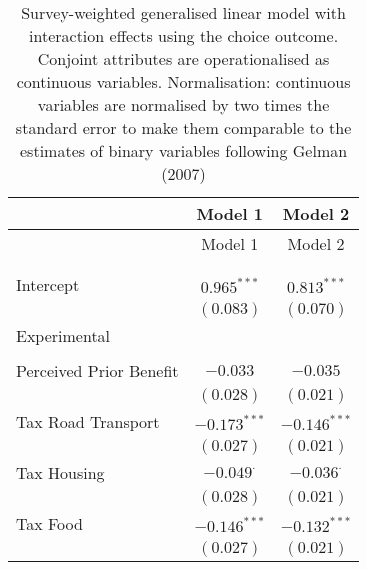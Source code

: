
\begin{center}
\begin{tiny}
\begin{longtable}{l@{} c@{} c@{}}
\hline
 & Model 1 & Model 2 \\
\hline
\endfirsthead
\hline
 & Model 1 & Model 2 \\
\hline
\endhead
\hline
\endfoot
\hline
\multicolumn{3}{l}{\tiny{$^{***}p<0.001$; $^{**}p<0.01$; $^{*}p<0.05$; $^{\cdot}p<0.1$}}\\
\caption{Survey-weighted generalised linear model with interaction effects using the choice outcome. Conjoint attributes are operationalised as continuous variables. Normalisation: continuous variables are normalised by two times 
               the standard error to make them comparable to the estimates of binary variables following Gelman (2007)}
\label{table:weighted_interactions_exp_continous_choice}
\endlastfoot \\
Intercept                                                & $0.965^{***}$    & $0.813^{***}$    \\
                                                         & $(0.083)$        & $(0.070)$        \\
Experimental                                             &                  &                  \\
                                                         &                  &                  \\
\quad Perceived Prior Benefit                            & $-0.033$         & $-0.035$         \\
                                                         & $(0.028)$        & $(0.021)$        \\
\quad Tax Road Transport                                 & $-0.173^{***}$   & $-0.146^{***}$   \\
                                                         & $(0.027)$        & $(0.021)$        \\
\quad Tax Housing                                        & $-0.049^{\cdot}$ & $-0.036^{\cdot}$ \\
                                                         & $(0.028)$        & $(0.021)$        \\
\quad Tax Food                                           & $-0.146^{***}$   & $-0.132^{***}$   \\
                                                         & $(0.027)$        & $(0.021)$        \\

\end{longtable}
\end{tiny}
\end{center}
